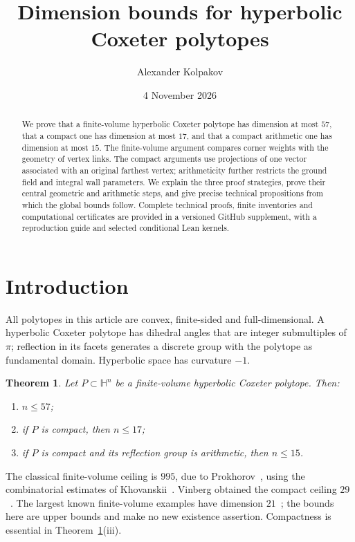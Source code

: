 \documentclass[11pt]{article}
\title{Dimension bounds for hyperbolic Coxeter polytopes}
\author{Alexander Kolpakov}
\date{4 November 2026}
\newtheorem{theorem}{Theorem}[section]
\theoremstyle{remark}\newtheorem{remark}[theorem]{Remark}
\numberwithin{equation}{section}
\newcommand{\HH}{\mathbb H}
\begin{document}
\maketitle

\begin{abstract}
We prove that a finite-volume hyperbolic Coxeter polytope has dimension
at most $57$, that a compact one has dimension at most $17$, and that a
compact arithmetic one has dimension at most $15$. The finite-volume
argument compares corner weights with the geometry of vertex links.
The compact arguments use projections of one vector associated with an
original farthest vertex; arithmeticity further restricts the ground
field and integral wall parameters. We explain the three proof strategies,
prove their central geometric and arithmetic steps, and give precise
technical propositions from which the global bounds follow. Complete
technical proofs, finite inventories and computational certificates are
provided in a versioned GitHub supplement, with a reproduction guide and
selected conditional Lean kernels.
\end{abstract}

\section{Introduction}
All polytopes in this article are convex, finite-sided and
full-dimensional. A hyperbolic Coxeter polytope has dihedral angles
that are integer submultiples of $\pi$; reflection in its facets
generates a discrete group with the polytope as fundamental domain.
Hyperbolic space has curvature $-1$.

\begin{theorem}\label{thm:main}
Let $P\subset\HH^n$ be a finite-volume hyperbolic Coxeter polytope.
Then:
\begin{enumerate}[label=\textup{(\roman*)},nosep]
\item $n\le57$;
\item if $P$ is compact, then $n\le17$;
\item if $P$ is compact and its reflection group is arithmetic, then
 $n\le15$.
\end{enumerate}
\end{theorem}

The classical finite-volume ceiling is $995$, due to
Prokhorov~\cite{Prokhorov}, using the combinatorial estimates of
Khovanskii~\cite{Khovanskii}. Vinberg obtained the compact ceiling
$29$~\cite{Vin84,Vin85}. The largest known finite-volume examples
have dimension $21$~\cite{Borcherds}; the bounds here are upper bounds
and make no new existence assertion. Compactness is essential in
Theorem~\ref{thm:main}(iii).
\end{document}
